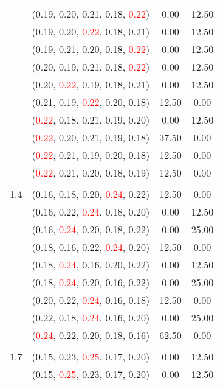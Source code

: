 \documentclass[10pt,a4paper]{report}
\begin{document}
\begin{center}
\begin{longtable}{clcc}
			&(0.19, 0.20, 0.21, \textcolor{black}{0.18}, \textcolor{red}{0.22})&0.00&12.50\\
			&(0.19, 0.20, \textcolor{red}{0.22}, \textcolor{black}{0.18}, 0.21)&0.00&12.50\\
			&(0.19, 0.21, 0.20, \textcolor{black}{0.18}, \textcolor{red}{0.22})&0.00&12.50\\
			&(0.20, 0.19, 0.21, \textcolor{black}{0.18}, \textcolor{red}{0.22})&0.00&12.50\\
			&(0.20, \textcolor{red}{0.22}, 0.19, \textcolor{black}{0.18}, 0.21)&0.00&12.50\\
			&(0.21, 0.19, \textcolor{red}{0.22}, 0.20, \textcolor{black}{0.18})&12.50&0.00\\
			&(\textcolor{red}{0.22}, \textcolor{black}{0.18}, 0.21, 0.19, 0.20)&0.00&12.50\\
			&(\textcolor{red}{0.22}, 0.20, 0.21, 0.19, \textcolor{black}{0.18})&37.50&0.00\\
			&(\textcolor{red}{0.22}, 0.21, 0.19, 0.20, \textcolor{black}{0.18})&12.50&0.00\\
			&(\textcolor{red}{0.22}, 0.21, 0.20, \textcolor{black}{0.18}, 0.19)&12.50&0.00\\
		&&&\\
		1.4			&(\textcolor{black}{0.16}, 0.18, 0.20, \textcolor{red}{0.24}, 0.22)&12.50&0.00\\
			&(\textcolor{black}{0.16}, 0.22, \textcolor{red}{0.24}, 0.18, 0.20)&0.00&12.50\\
			&(\textcolor{black}{0.16}, \textcolor{red}{0.24}, 0.20, 0.18, 0.22)&0.00&25.00\\
			&(0.18, \textcolor{black}{0.16}, 0.22, \textcolor{red}{0.24}, 0.20)&12.50&0.00\\
			&(0.18, \textcolor{red}{0.24}, \textcolor{black}{0.16}, 0.20, 0.22)&0.00&12.50\\
			&(0.18, \textcolor{red}{0.24}, 0.20, \textcolor{black}{0.16}, 0.22)&0.00&25.00\\
			&(0.20, 0.22, \textcolor{red}{0.24}, \textcolor{black}{0.16}, 0.18)&12.50&0.00\\
			&(0.22, 0.18, \textcolor{red}{0.24}, \textcolor{black}{0.16}, 0.20)&0.00&25.00\\
			&(\textcolor{red}{0.24}, 0.22, 0.20, 0.18, \textcolor{black}{0.16})&62.50&0.00\\
		&&&\\
		1.7			&(\textcolor{black}{0.15}, 0.23, \textcolor{red}{0.25}, 0.17, 0.20)&0.00&12.50\\
			&(\textcolor{black}{0.15}, \textcolor{red}{0.25}, 0.23, 0.17, 0.20)&0.00&12.50\\

\end{longtable}
\end{center}
\end{document}

